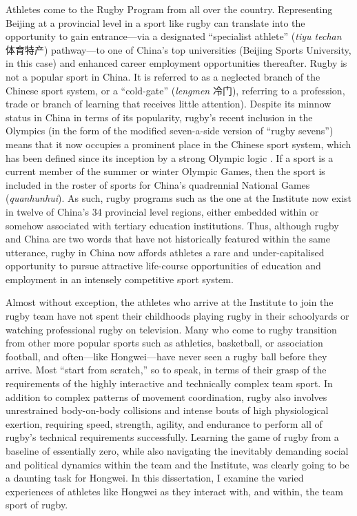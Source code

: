 Athletes come to the Rugby Program from all over the country.  Representing Beijing at a provincial level in a sport like rugby can translate into the opportunity to gain entrance---via a designated ``specialist athlete'' (\textit{tiyu techan} 体育特产)
pathway---to one of China's top universities (Beijing Sports University, in this case) and enhanced career employment opportunities thereafter.  Rugby is not a popular sport in China. It is referred to as a neglected branch of the Chinese sport system, or a ``cold-gate'' (\textit{lengmen} 冷门), referring to a profession, trade or branch of learning that receives little attention). Despite its minnow status in China in terms of its popularity, rugby's recent inclusion in the Olympics (in the form of the modified seven-a-side version of ``rugby sevens'') means that it now occupies a prominent place in the Chinese sport system, which has been defined since its inception by a strong Olympic logic \citep{Brownell2008}.  If a sport is a current member of the summer or winter Olympic Games, then the sport is included in the roster of sports for China's quadrennial National Games (\textit{quanhunhui}). As such, rugby programs such as the one at the Institute now exist in twelve of China's 34 provincial level regions, either embedded within or somehow associated with tertiary education institutions. Thus, although rugby and China are two words that have not historically featured within the same utterance, rugby in China now affords athletes a rare and under-capitalised opportunity to pursue attractive life-course opportunities of education and employment in an intensely competitive sport system.

Almost without exception, the athletes who arrive at the Institute to join the rugby team have not spent their childhoods playing rugby in their schoolyards or watching professional rugby on television. Many who come to rugby transition from other more popular sports such as athletics, basketball, or association football, and often---like Hongwei---have never seen a rugby ball before they arrive.  Most ``start from scratch,'' so to speak, in terms of their grasp of the requirements of the highly interactive and technically complex team sport. In addition to complex patterns of movement coordination, rugby also involves unrestrained body-on-body collisions and intense bouts of high physiological exertion, requiring speed, strength, agility, and endurance to perform all of rugby's technical requirements successfully.  Learning the game of rugby from a baseline of essentially zero, while also navigating the inevitably demanding social and political dynamics within the team and the Institute, was clearly going to be a daunting task for Hongwei.  In this dissertation, I examine the varied experiences of athletes like Hongwei as they interact with, and within, the team sport of rugby.


